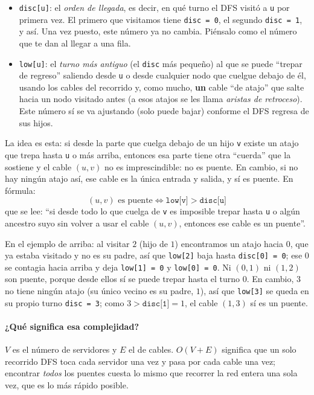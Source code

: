 \begin{itemize}
  \item \texttt{disc[u]}: el \emph{orden de llegada}, es decir, en qué turno
        el DFS visitó a \texttt{u} por primera vez. El primero que visitamos
        tiene \texttt{disc = 0}, el segundo \texttt{disc = 1}, y así. Una vez
        puesto, este número ya no cambia. Piénsalo como el número que te dan
        al llegar a una fila.
  \item \texttt{low[u]}: el \emph{turno más antiguo} (el \texttt{disc} más
        pequeño) al que se puede ``trepar de regreso'' saliendo desde
        \texttt{u} o desde cualquier nodo que cuelgue debajo de él, usando
        los cables del recorrido y, como mucho, \textbf{un} cable ``de
        atajo'' que salte hacia un nodo visitado antes (a esos atajos se les
        llama \emph{aristas de retroceso}). Este número sí se va ajustando
        (solo puede bajar) conforme el DFS regresa de sus hijos.
\end{itemize}

La idea es esta: si desde la parte que cuelga debajo de un hijo \texttt{v}
existe un atajo que trepa hasta \texttt{u} o más arriba, entonces esa parte
tiene otra ``cuerda'' que la sostiene y el cable $(u,v)$ no es imprescindible:
no es puente. En cambio, si no hay ningún atajo así, ese cable es la única
entrada y salida, y sí es puente. En fórmula:
$$(u,v) \text{ es puente} \iff \texttt{low[v]} > \texttt{disc[u]}$$
que se lee: ``si desde todo lo que cuelga de \texttt{v} es imposible trepar
hasta \texttt{u} o algún ancestro suyo sin volver a usar el cable $(u,v)$,
entonces ese cable es un puente''.

En el ejemplo de arriba: al visitar $2$ (hijo de $1$) encontramos un atajo
hacia $0$, que ya estaba visitado y no es su padre, así que \texttt{low[2]}
baja hasta \texttt{disc[0] = 0}; ese $0$ se contagia hacia arriba y deja
\texttt{low[1] = 0} y \texttt{low[0] = 0}. Ni $(0,1)$ ni $(1,2)$ son puente,
porque desde ellos sí se puede trepar hasta el turno $0$. En cambio, $3$ no
tiene ningún atajo (su único vecino es su padre, $1$), así que \texttt{low[3]}
se queda en su propio turno \texttt{disc = 3}; como $3 > \texttt{disc[1]} = 1$,
el cable $(1,3)$ sí es un puente.




\paragraph{¿Qué significa esa complejidad?} $V$ es el número de servidores y
$E$ el de cables. $O(V+E)$ significa que un solo recorrido DFS toca cada
servidor una vez y pasa por cada cable una vez; encontrar \emph{todos} los
puentes cuesta lo mismo que recorrer la red entera una sola vez, que es lo más
rápido posible.


